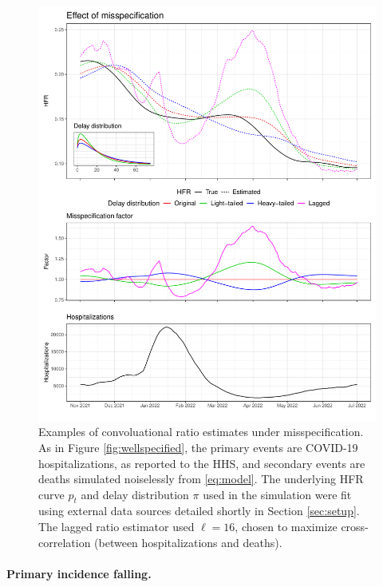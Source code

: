 \documentclass{article}
\begin{document}
\begin{figure}[htbp]
\centering
\includegraphics[width=\linewidth]{Figures/Simulated/toy_misp.pdf}
\caption{Examples of convoluational ratio estimates under misspecification. As
  in Figure \ref{fig:wellspecified}, the primary events are COVID-19
  hospitalizations, as reported to the HHS, and secondary events are deaths
  simulated noiselessly from \eqref{eq:model}. The underlying HFR curve $p_t$
  and delay distribution $\pi$ used in the simulation were fit using external
  data sources detailed shortly in Section \ref{sec:setup}. The lagged ratio
  estimator used $\ell=16$, chosen to maximize cross-correlation (between
  hospitalizations and deaths).} 
\label{fig:misspecified}
\end{figure}

\paragraph{Primary incidence falling.}
\end{document}
